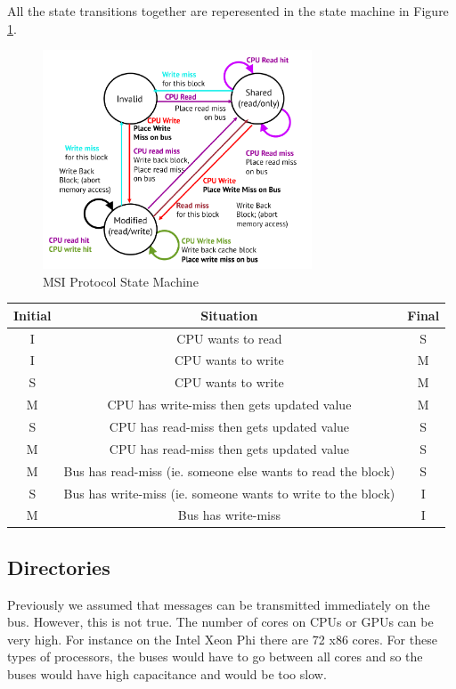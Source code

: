 \documentclass{article}
\begin{document}
All the state transitions together are reperesented in the state machine in Figure \ref{MSI}.


 \begin{figure}[ht!]
\centering
\includegraphics[width=80mm]{img/MSI.png}
\caption{MSI Protocol State Machine}
\label{MSI}
\end{figure}

\begin{table}
\centering
\begin{tabular}{ccc}
\toprule
\textbf{Initial} & \textbf{Situation} & \textbf{Final} \\
\midrule
I & CPU wants to read & S \\
I & CPU wants to write & M \\
S & CPU wants to write & M \\
M & CPU has write-miss then gets updated value & M \\
S & CPU has read-miss then gets updated value & S \\
M & CPU has read-miss then gets updated value & S \\
M & Bus has read-miss (ie. someone else wants to read the block) & S \\
S & Bus has write-miss (ie. someone wants to write to the block) & I \\
M & Bus has write-miss & I \\
\toprule

\end{tabular}
\end{table}

\subsection{Directories}

Previously we assumed that messages can be transmitted immediately on the bus. However, this is not true. The number of cores on CPUs or GPUs can be very high. For instance on the Intel Xeon Phi there are 72 x86 cores. For these types of processors, the buses would have to go between all cores and so the buses would have high capacitance and would be too slow. 
\end{document}
